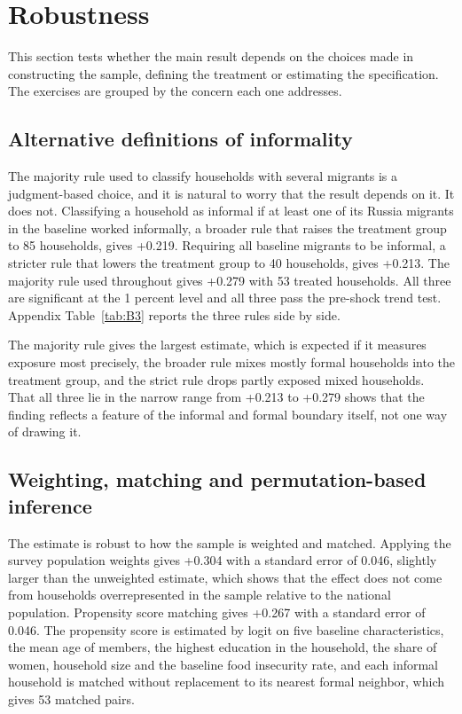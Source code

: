 \section{Robustness}\label{sec:8}

This section tests whether the main result depends on the choices made in constructing the sample, defining the treatment or estimating the specification. The exercises are grouped by the concern each one addresses.

\subsection{Alternative definitions of informality}\label{sec:8-1}

The majority rule used to classify households with several migrants is a judgment-based choice, and it is natural to worry that the result depends on it. It does not. Classifying a household as informal if at least one of its Russia migrants in the baseline worked informally, a broader rule that raises the treatment group to 85 households, gives +0.219. Requiring all baseline migrants to be informal, a stricter rule that lowers the treatment group to 40 households, gives +0.213. The majority rule used throughout gives +0.279 with 53 treated households. All three are significant at the 1 percent level and all three pass the pre-shock trend test. Appendix Table~\ref{tab:B3} reports the three rules side by side.

The majority rule gives the largest estimate, which is expected if it measures exposure most precisely, the broader rule mixes mostly formal households into the treatment group, and the strict rule drops partly exposed mixed households. That all three lie in the narrow range from +0.213 to +0.279 shows that the finding reflects a feature of the informal and formal boundary itself, not one way of drawing it.

\subsection{Weighting, matching and permutation-based inference}\label{sec:8-2}

The estimate is robust to how the sample is weighted and matched. Applying the survey population weights gives +0.304 with a standard error of 0.046, slightly larger than the unweighted estimate, which shows that the effect does not come from households overrepresented in the sample relative to the national population. Propensity score matching gives +0.267 with a standard error of 0.046. The propensity score is estimated by logit on five baseline characteristics, the mean age of members, the highest education in the household, the share of women, household size and the baseline food insecurity rate, and each informal household is matched without replacement to its nearest formal neighbor, which gives 53 matched pairs.

